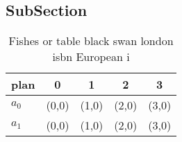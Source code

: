 \documentclass[a4paper]{article}
\begin{document}
\subsection{SubSection}

\begin{table}
\begin{adjustbox}{width=0.7\columnwidth}
\begin{tabular}{|l|l|l|l|l|}
\hline
\textbf{plan} & \multicolumn{1}{c|}{\textbf{0}} & \multicolumn{1}{c|}{\textbf{1}} & \multicolumn{1}{c|}{\textbf{2}} & \multicolumn{1}{c|}{\textbf{3}} \\ \hline
\textbf{$a_0$}  & (0,0) & (1,0) & (2,0) & (3,0) \\ \hline
\textbf{$a_1$}  & (0,0) & (1,0) & (2,0) & (3,0) \\ \hline
\end{tabular}
\end{adjustbox}
\caption{Fishes or table black swan london isbn European i
}
\end{table}
\end{document}
